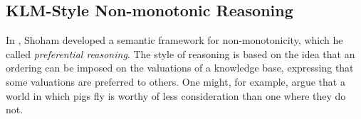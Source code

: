

\subsection{KLM-Style Non-monotonic Reasoning}
\label{subsection: non-monotonic reasoning}

In \cite{shoham1987nonmonotonic,shoham1987reasoning}, Shoham developed a semantic framework for non-monotonicity, which he called \textit{preferential reasoning}. The style of reasoning is based on the idea that an ordering can be imposed on the valuations of a knowledge base, expressing that some valuations are preferred to others. One might, for example, argue that a world in which pigs fly is worthy of less consideration than one where they do not.

